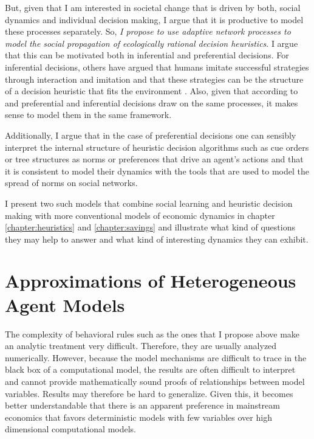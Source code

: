 But, given that I am interested in societal change that is driven by both, social dynamics and individual decision making, I argue that it is productive to model these processes separately. So, \emph{I propose to use adaptive network processes to model the social propagation of ecologically rational decision heuristics}.
I argue that this can be motivated both in inferential and preferential decisions. For inferential decisions, others have argued that humans imitate successful strategies through interaction and imitation \citep{Bandura1971, Traulsen2010} and that these strategies can be the structure of a decision heuristic that fits the environment \citep{Garcia-Retamero2009}. Also, given that according to \cite{Weber2009} and \cite{Gigerenzer2011} preferential and inferential decisions draw on the same processes, it makes sense to model them in the same framework. 

Additionally, I argue that in the case of preferential decisions one can sensibly interpret the internal structure of heuristic decision algorithms such as cue orders or tree structures as norms or preferences that drive an agent's actions and that it is consistent to model their dynamics with the tools that are used to model the spread of norms on social networks.

I present two such models that combine social learning and heuristic decision making with more conventional models of economic dynamics in chapter \ref{chapter:heuristics} and \ref{chapter:savings} and illustrate what kind of questions they may help to answer and what kind of interesting dynamics they can exhibit.

\section{Approximations of Heterogeneous Agent Models}

The complexity of behavioral rules such as the ones that I propose above make an analytic treatment very difficult. Therefore, they are usually analyzed numerically. However, because the model mechanisms are difficult to trace in the black box of a computational model, the results are often difficult to interpret and cannot provide mathematically sound proofs of relationships between model variables. Results may therefore be hard to generalize. Given this, it becomes better understandable that there is an apparent preference in mainstream economics that favors deterministic models with few variables over high dimensional computational models.


